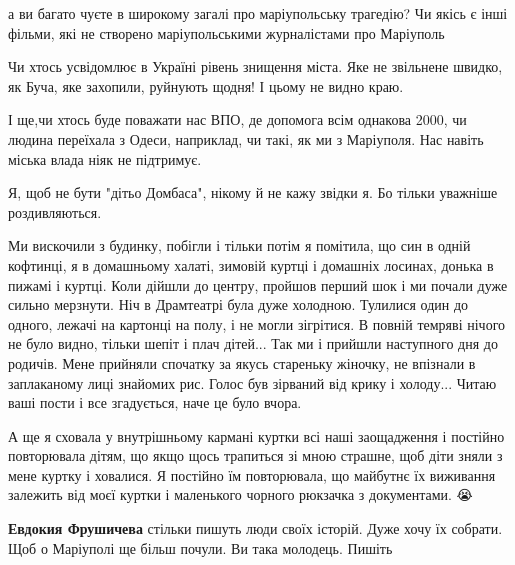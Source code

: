 \begin{itemize}
а ви багато чуєте в широкому загалі про маріупольську трагедію? Чи якісь є інші
фільми, які не створено маріупольськими журналістами про Маріуполь

Чи хтось усвідомлює в Україні рівень знищення міста. Яке не звільнене швидко,
як Буча, яке захопили, руйнують щодня! І цьому не видно краю.

І ще,чи хтось буде поважати нас ВПО, де допомога всім однакова 2000, чи людина
переїхала з Одеси, наприклад, чи такі, як ми з Маріуполя. Нас навіть міська
влада ніяк не підтримує.

Я, щоб не бути "дітьо Домбаса", нікому й не кажу звідки я. Бо тільки уважніше
роздивляються.

\end{itemize} %


Ми вискочили з будинку, побігли і тільки потім я помітила, що син в одній
кофтинці, я в домашньому халаті, зимовій куртці і домашніх лосинах, донька в
пижамі і куртці. Коли дійшли до центру, пройшов перший шок і ми почали дуже
сильно мерзнути. Ніч в Драмтеатрі була дуже холодною. Тулилися один до одного,
лежачі на картонці на полу, і не могли зігрітися. В повній темряві нічого не
було видно, тільки шепіт і плач дітей... Так ми і прийшли наступного дня до
родичів. Мене прийняли спочатку за якусь стареньку жіночку, не впізнали в
заплаканому лиці знайомих рис. Голос був зірваний від крику і холоду... Читаю
ваші пости і все згадується, наче це було вчора.

А ще я сховала у внутрішньому кармані куртки всі наші заощадження і постійно
повторювала дітям, що якщо щось трапиться зі мною страшне, щоб діти зняли з
мене куртку і ховалися. Я постійно їм повторювала, що майбутнє їх виживання
залежить від моєї куртки і маленького чорного рюкзачка з документами. 😭

\begin{itemize} %
\textbf{Евдокия Фрушичева} стільки пишуть люди своїх історій. Дуже хочу їх собрати. Щоб о Маріуполі ще більш почули. Ви така молодець. Пишіть 
\end{itemize} %


